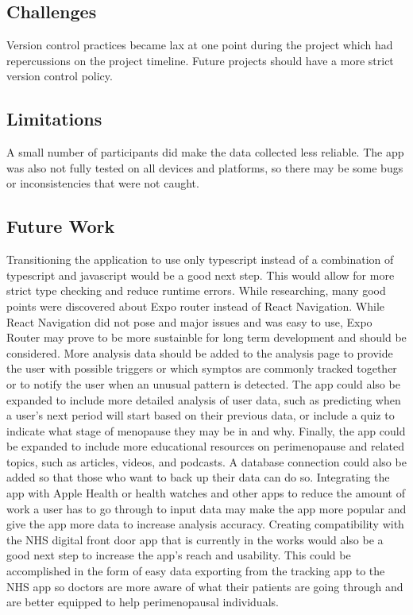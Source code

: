 \subsection{Challenges}
Version control practices became lax at one point during the project which had repercussions on the project timeline. Future projects should have a more strict version control policy. 

\subsection{Limitations}
A small number of participants did make the data collected less reliable. The app was also not fully tested on all devices and platforms, so there may be some bugs or inconsistencies that were not caught.


\subsection{Future Work}
Transitioning the application to use only typescript instead of a combination of typescript and javascript would be a good next step. This would allow for more strict type checking and reduce runtime errors. While researching, many good points were discovered about Expo router instead of React Navigation. While React Navigation did not pose and major issues and was easy to use, Expo Router may prove to be more sustainble for long term development and should be considered. More analysis data should be added to the analysis page to provide the user with possible triggers or which symptos are commonly tracked together or to notify the user when an unusual pattern is detected. The app could also be expanded to include more detailed analysis of user data, such as predicting when a user's next period will start based on their previous data, or include a quiz to indicate what stage of menopause they may be in and why. Finally, the app could be expanded to include more educational resources on perimenopause and related topics, such as articles, videos, and podcasts. A database connection could also be added so that those who want to back up their data can do so. Integrating the app with Apple Health or health watches and other apps to reduce the amount of work a user has to go through to input data may make the app more popular and give the app more data to increase analysis accuracy. Creating compatibility with the NHS digital front door app that is currently in the works would also be a good next step to increase the app's reach and usability. This could be accomplished in the form of easy data exporting from the tracking app to the NHS app so doctors are more aware of what their patients are going through and are better equipped to help perimenopausal individuals.

